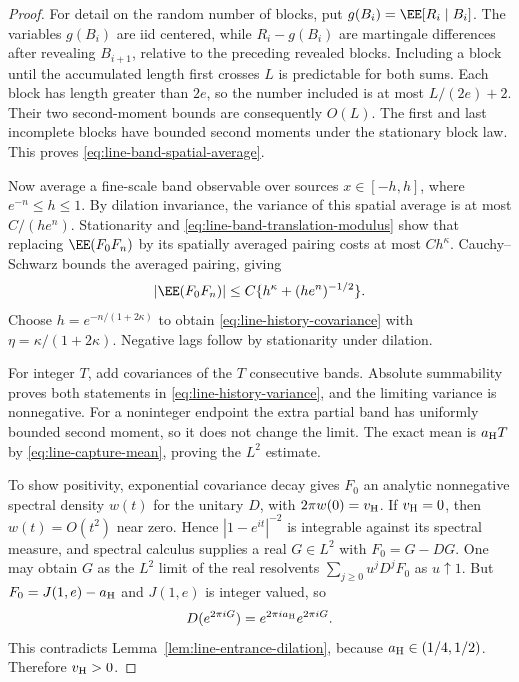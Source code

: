 \documentclass[11pt,letterpaper]{article}
\begin{document}
\begin{proof}
For detail on the random number of blocks, put
$g(B_i)=\EE[R_i\mid B_i]$. The variables $g(B_i)$ are iid centered,
while $R_i-g(B_i)$ are martingale differences after revealing
$B_{i+1}$, relative to the preceding revealed blocks.
Including a block until the accumulated length first crosses $L$
is predictable for both sums. Each block has length greater than
$2e$, so the number included is at most $L/(2e)+2$.
Their two second-moment bounds are consequently $O(L)$.
The first and last incomplete blocks have bounded second moments
under the stationary block law. This proves
\eqref{eq:line-band-spatial-average}.

Now average a fine-scale band observable over sources
$x\in[-h,h]$, where $e^{-n}\le h\le1$. By dilation invariance,
the variance of this spatial average is at most $C/(he^n)$.
Stationarity and \eqref{eq:line-band-translation-modulus} show that
replacing $\EE(F_0F_n)$ by its spatially averaged pairing costs
at most $Ch^\kappa$. Cauchy--Schwarz bounds the averaged pairing,
giving
\[
 |\EE(F_0F_n)|\le C\{h^\kappa+(he^n)^{-1/2}\}.
\]
Choose $h=e^{-n/(1+2\kappa)}$ to obtain
\eqref{eq:line-history-covariance} with
$\eta=\kappa/(1+2\kappa)$. Negative lags follow by stationarity
under dilation.

For integer $T$, add covariances of the $T$ consecutive bands.
Absolute summability proves both statements in
\eqref{eq:line-history-variance}, and the limiting variance is
nonnegative. For a noninteger endpoint the extra partial band has
uniformly bounded second moment, so it does not change the limit.
The exact mean is $a_{\rm H}T$ by
\eqref{eq:line-capture-mean}, proving the $L^2$ estimate.

To show positivity, exponential covariance decay gives $F_0$ an
analytic nonnegative spectral density $w(t)$ for the unitary $D$,
with $2\pi w(0)=v_{\rm H}$. If $v_{\rm H}=0$, then $w(t)=O(t^2)$
near zero. Hence $|1-e^{it}|^{-2}$ is integrable against its spectral
measure, and spectral calculus supplies a real $G\in L^2$ with
$F_0=G-DG$. One may obtain $G$ as the $L^2$ limit of the real
resolvents $\sum_{j\ge0}u^jD^jF_0$ as $u\uparrow1$.
But $F_0=J(1,e)-a_{\rm H}$ and $J(1,e)$ is integer valued, so
\[
 D(e^{2\pi iG})=e^{2\pi i a_{\rm H}}e^{2\pi iG}.
\]
This contradicts Lemma~\ref{lem:line-entrance-dilation}, because
$a_{\rm H}\in(1/4,1/2)$. Therefore $v_{\rm H}>0$.
\end{proof}
\end{document}
